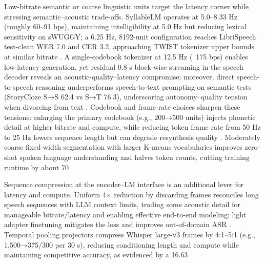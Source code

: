 Low-bitrate semantic or coarse linguistic units target the latency corner while stressing semantic–acoustic trade-offs. SyllableLM operates at 5.0–8.33 Hz (roughly 60–91 bps), maintaining intelligibility at 5.0 Hz but reducing lexical sensitivity on sWUGGY; a 6.25 Hz, 8192-unit configuration reaches LibriSpeech test-clean WER 7.0 and CER 3.2, approaching TWIST tokenizer upper bounds at similar bitrate \cite{baade2024syllablelmlearningcoarsesemanticunitsspe}. A single-codebook tokenizer at 12.5 Hz (~175 bps) enables low-latency generation, yet residual 0.8 s block-wise streaming in the speech decoder reveals an acoustic-quality–latency compromise; moreover, direct speech-to-speech reasoning underperforms speech-to-text prompting on semantic tests (StoryCloze S→S 62.4 vs S→T 76.3), underscoring autonomy–quality tension when divorcing from text \cite{zeng2024glm4voicetowardsintelligenthumanlikeends}. Codebook and frame-rate choices sharpen these tensions: enlarging the primary codebook (e.g., 200→500 units) injects phonetic detail at higher bitrate and compute, while reducing token frame rate from 50 Hz to 25 Hz lowers sequence length but can degrade resynthesis quality \cite{chang2024dcspinspeakerinvariantspeechtokenizerspo}. Moderately coarse fixed-width segmentation with larger K-means vocabularies improves zero-shot spoken language understanding and halves token counts, cutting training runtime by about 70%



Sequence compression at the encoder–LM interface is an additional lever for latency and compute. Uniform 4× reduction by discarding frames reconciles long speech sequences with LLM context limits, trading some acoustic detail for manageable bitrate/latency and enabling effective end-to-end modeling; light adapter finetuning mitigates the loss and improves out-of-domain ASR \cite{wang2023slmbridgethingapbetweenspeechtextfoundat}. Temporal pooling projectors compress Whisper large-v3 frames by 4:1–5:1 (e.g., 1,500→375/300 per 30 s), reducing conditioning length and compute while maintaining competitive accuracy, as evidenced by a 16.63%



